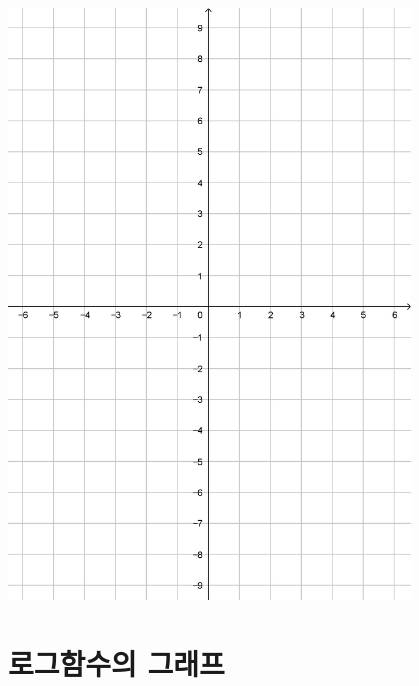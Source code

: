\documentclass{oblivoir}
\begin{document}
\begin{center}
\includegraphics[width=0.8\textwidth]{69grid}
\end{center}

\section{로그함수의 그래프}
\end{document}
